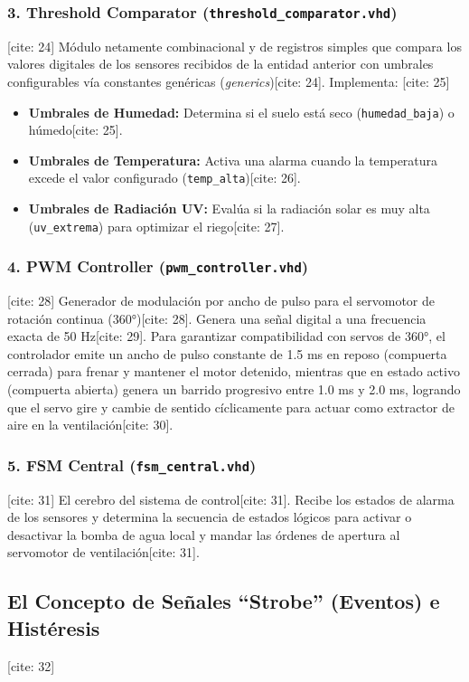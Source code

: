 \subsubsection{3. Threshold Comparator (\texttt{threshold\_comparator.vhd})} [cite: 24]
Módulo netamente combinacional y de registros simples que compara los valores digitales de los sensores recibidos de la entidad anterior con umbrales configurables vía constantes genéricas (\textit{generics})[cite: 24]. Implementa: [cite: 25]
\begin{itemize}
	\item \textbf{Umbrales de Humedad:} Determina si el suelo está seco (\texttt{humedad\_baja}) o húmedo[cite: 25].
	\item \textbf{Umbrales de Temperatura:} Activa una alarma cuando la temperatura excede el valor configurado (\texttt{temp\_alta})[cite: 26].
	\item \textbf{Umbrales de Radiación UV:} Evalúa si la radiación solar es muy alta (\texttt{uv\_extrema}) para optimizar el riego[cite: 27].
\end{itemize}

\subsubsection{4. PWM Controller (\texttt{pwm\_controller.vhd})} [cite: 28]
Generador de modulación por ancho de pulso para el servomotor de rotación continua (360°)[cite: 28]. Genera una señal digital a una frecuencia exacta de 50 Hz[cite: 29]. Para garantizar compatibilidad con servos de 360°, el controlador emite un ancho de pulso constante de 1.5 ms en reposo (compuerta cerrada) para frenar y mantener el motor detenido, mientras que en estado activo (compuerta abierta) genera un barrido progresivo entre 1.0 ms y 2.0 ms, logrando que el servo gire y cambie de sentido cíclicamente para actuar como extractor de aire en la ventilación[cite: 30].


\subsubsection{5. FSM Central (\texttt{fsm\_central.vhd})} [cite: 31]
El cerebro del sistema de control[cite: 31]. Recibe los estados de alarma de los sensores y determina la secuencia de estados lógicos para activar o desactivar la bomba de agua local y mandar las órdenes de apertura al servomotor de ventilación[cite: 31].

\subsection{El Concepto de Señales ``Strobe'' (Eventos) e Histéresis} [cite: 32]


